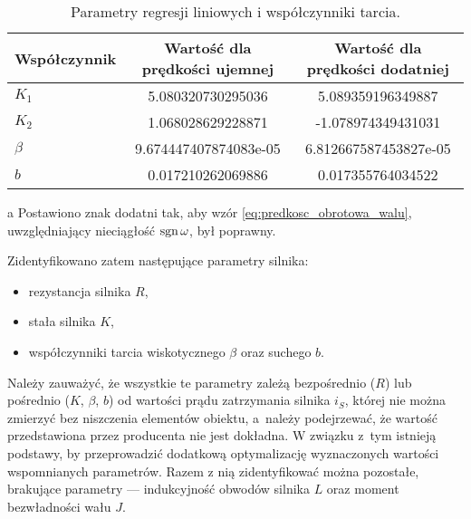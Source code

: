 \begin{table}[p]
    \centering
    \begin{threeparttable}
        \caption{Parametry regresji liniowych i współczynniki tarcia.}
        \label{tab:param_regresji_lin_wsp_tarcia}
        
        \begin{tabular}{l | S[round-mode=places, round-precision=6] | S[round-mode=places, round-precision=6]}
            \toprule
            Współczynnik & {Wartość dla prędkości ujemnej} & {Wartość dla prędkości dodatniej} \\
            \midrule
            $K_1$ & 5.080320730295036 & 5.089359196349887 \\
            $K_2$ & 1.068028629228871 & -1.078974349431031 \\
            $\beta$ & 9.674447407874083e-05 & 6.812667587453827e-05 \\
            $b$ & 0.017210262069886 & 0.017355764034522 \\
            \bottomrule
        \end{tabular}
        
        \begin{tablenotes}
            \footnotesize
            \item[a] Postawiono znak dodatni tak, aby wzór \eqref{eq:predkosc_obrotowa_walu}, uwzględniający nieciągłość $\operatorname{sgn} \omega$, był poprawny.
        \end{tablenotes}
    \end{threeparttable}
\end{table}

\pagebreak

Zidentyfikowano zatem następujące parametry silnika:
\begin{itemize}
    \item rezystancja silnika $R$,
    \item stała silnika $K$,
    \item współczynniki tarcia wiskotycznego $\beta$ oraz suchego $b$.
\end{itemize}

Należy zauważyć, że wszystkie te parametry zależą bezpośrednio ($R$) lub pośrednio ($K$, $\beta$, $b$) od wartości prądu zatrzymania silnika $i_S$, której nie można zmierzyć bez niszczenia elementów obiektu, a~należy podejrzewać, że wartość przedstawiona przez producenta nie jest dokładna. W związku z~tym istnieją podstawy, by przeprowadzić dodatkową optymalizację wyznaczonych wartości wspomnianych parametrów. Razem z nią zidentyfikować można pozostałe, brakujące parametry --- indukcyjność obwodów silnika $L$ oraz moment bezwładności wału $J$.

